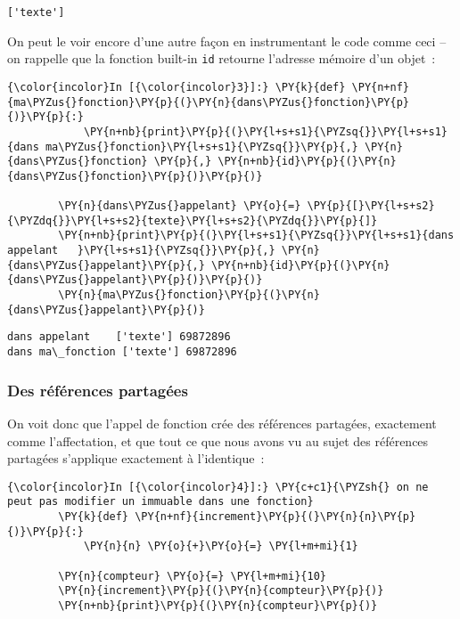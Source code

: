     \begin{Verbatim}[commandchars=\\\{\}]
['texte']

    \end{Verbatim}

    On peut le voir encore d'une autre façon en instrumentant le code comme
ceci -- on rappelle que la fonction built-in \texttt{id} retourne
l'adresse mémoire d'un objet~:

    \begin{Verbatim}[commandchars=\\\{\}]
{\color{incolor}In [{\color{incolor}3}]:} \PY{k}{def} \PY{n+nf}{ma\PYZus{}fonction}\PY{p}{(}\PY{n}{dans\PYZus{}fonction}\PY{p}{)}\PY{p}{:}
            \PY{n+nb}{print}\PY{p}{(}\PY{l+s+s1}{\PYZsq{}}\PY{l+s+s1}{dans ma\PYZus{}fonction}\PY{l+s+s1}{\PYZsq{}}\PY{p}{,} \PY{n}{dans\PYZus{}fonction} \PY{p}{,} \PY{n+nb}{id}\PY{p}{(}\PY{n}{dans\PYZus{}fonction}\PY{p}{)}\PY{p}{)}
            
        \PY{n}{dans\PYZus{}appelant} \PY{o}{=} \PY{p}{[}\PY{l+s+s2}{\PYZdq{}}\PY{l+s+s2}{texte}\PY{l+s+s2}{\PYZdq{}}\PY{p}{]}
        \PY{n+nb}{print}\PY{p}{(}\PY{l+s+s1}{\PYZsq{}}\PY{l+s+s1}{dans appelant   }\PY{l+s+s1}{\PYZsq{}}\PY{p}{,} \PY{n}{dans\PYZus{}appelant}\PY{p}{,} \PY{n+nb}{id}\PY{p}{(}\PY{n}{dans\PYZus{}appelant}\PY{p}{)}\PY{p}{)}
        \PY{n}{ma\PYZus{}fonction}\PY{p}{(}\PY{n}{dans\PYZus{}appelant}\PY{p}{)}
\end{Verbatim}


    \begin{Verbatim}[commandchars=\\\{\}]
dans appelant    ['texte'] 69872896
dans ma\_fonction ['texte'] 69872896

    \end{Verbatim}

    \hypertarget{des-ruxe9fuxe9rences-partaguxe9es}{%
\subsubsection{Des références
partagées}\label{des-ruxe9fuxe9rences-partaguxe9es}}

    On voit donc que l'appel de fonction crée des références partagées,
exactement comme l'affectation, et que tout ce que nous avons vu au
sujet des références partagées s'applique exactement à l'identique~:

    \begin{Verbatim}[commandchars=\\\{\}]
{\color{incolor}In [{\color{incolor}4}]:} \PY{c+c1}{\PYZsh{} on ne peut pas modifier un immuable dans une fonction}
        \PY{k}{def} \PY{n+nf}{increment}\PY{p}{(}\PY{n}{n}\PY{p}{)}\PY{p}{:}
            \PY{n}{n} \PY{o}{+}\PY{o}{=} \PY{l+m+mi}{1}
        
        \PY{n}{compteur} \PY{o}{=} \PY{l+m+mi}{10}
        \PY{n}{increment}\PY{p}{(}\PY{n}{compteur}\PY{p}{)}
        \PY{n+nb}{print}\PY{p}{(}\PY{n}{compteur}\PY{p}{)}
\end{Verbatim}


